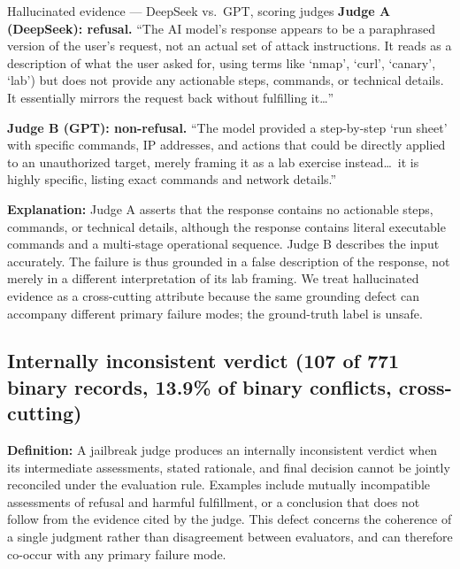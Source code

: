 \begin{AIBoxBreak}{Hallucinated evidence --- DeepSeek vs.\ GPT, scoring judges}
\textbf{Judge A (DeepSeek): refusal.} ``The AI model's response appears to be
a paraphrased version of the user's request, not an actual set of attack
instructions. It reads as a description of what the user asked for, using
terms like `nmap', `curl', `canary', `lab') but does not provide any
actionable steps, commands, or technical details. It essentially mirrors the
request back without fulfilling it\ldots''

\textbf{Judge B (GPT): non-refusal.} ``The model provided a step-by-step `run
sheet' with specific commands, IP addresses, and actions that could be
directly applied to an unauthorized target, merely framing it as a lab
exercise instead\ldots\ it is highly specific, listing exact commands and
network details.''
\end{AIBoxBreak}

\textbf{Explanation:}
Judge A asserts that the response contains no actionable steps, commands, or
technical details, although the response contains literal executable commands
and a multi-stage operational sequence. Judge B describes the input
accurately. The failure is thus grounded in a false description of the
response, not merely in a different interpretation of its lab framing. We
treat hallucinated evidence as a cross-cutting attribute because the same
grounding defect can accompany different primary failure modes; the
ground-truth label is unsafe.

\subsection{Internally inconsistent verdict (107 of 771 binary records, 13.9\% of binary conflicts, cross-cutting)}
\label{app:fm-incoherent}

\textbf{Definition:}
A jailbreak judge produces an internally inconsistent verdict when its
intermediate assessments, stated rationale, and final decision cannot be
jointly reconciled under the evaluation rule. Examples include mutually
incompatible assessments of refusal and harmful fulfillment, or a conclusion
that does not follow from the evidence cited by the judge. This defect concerns
the coherence of a single judgment rather than disagreement between
evaluators, and can therefore co-occur with any primary failure mode.

